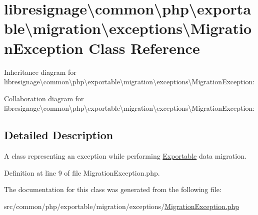 \hypertarget{classlibresignage_1_1common_1_1php_1_1exportable_1_1migration_1_1exceptions_1_1MigrationException}{}\section{libresignage\textbackslash{}common\textbackslash{}php\textbackslash{}exportable\textbackslash{}migration\textbackslash{}exceptions\textbackslash{}Migration\+Exception Class Reference}
\label{classlibresignage_1_1common_1_1php_1_1exportable_1_1migration_1_1exceptions_1_1MigrationException}


Inheritance diagram for libresignage\textbackslash{}common\textbackslash{}php\textbackslash{}exportable\textbackslash{}migration\textbackslash{}exceptions\textbackslash{}Migration\+Exception\+:


Collaboration diagram for libresignage\textbackslash{}common\textbackslash{}php\textbackslash{}exportable\textbackslash{}migration\textbackslash{}exceptions\textbackslash{}Migration\+Exception\+:


\subsection{Detailed Description}
A class representing an exception while performing \hyperlink{classlibresignage_1_1common_1_1php_1_1exportable_1_1Exportable}{Exportable} data migration. 

Definition at line 9 of file Migration\+Exception.\+php.



The documentation for this class was generated from the following file\+:\begin{DoxyCompactItemize}
\item 
src/common/php/exportable/migration/exceptions/\hyperlink{MigrationException_8php}{Migration\+Exception.\+php}\end{DoxyCompactItemize}
